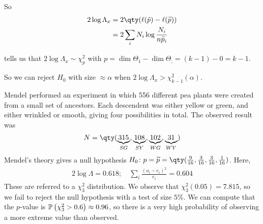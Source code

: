 So 
\begin{align*}
	2 \log \Lambda_x &= 2\qty(\ell(\hat p) - \ell(\widetilde p)) \\
	&= 2 \sum_i N_i \log \frac{N_i}{n \widetilde{p}_i}
\end{align*}

 tells us that $2 \log \Lambda_x \sim \chi_p^2$ with $p = \dim \Theta_1 - \dim \Theta_; = (k - 1) - 0 = k - 1$.

So we can reject $H_0$ with size $\approx \alpha$ when $2 \log \Lambda_x > \chi_{k - 1}^2(\alpha)$.

\begin{example}
	Mendel performed an experiment in which 556 different pea plants were created from a small set of ancestors.
	Each descendent was either yellow or green, and either wrinkled or smooth, giving four possibilities in total.
	The observed result was
	\begin{align*}
		N = \qty(\underbrace{315}_{SG}, \underbrace{108}_{SY}, \underbrace{102}_{WG}, \underbrace{31}_{WY})
	\end{align*}
	Mendel's theory gives a null hypothesis $H_0 \colon p = \widetilde p = \qty(\frac{9}{16}, \frac{3}{16}, \frac{3}{16}, \frac{1}{16})$.
	Here,
	\begin{align*}
		2 \log \Lambda = 0.618;\quad \sum_i \frac{(o_i - e_i)^2}{e_i} = 0.604
	\end{align*}
	These are referred to a $\chi^2_3$ distribution.
	We observe that $\chi^2_3(0.05) = 7.815$, so we fail to reject the null hypothesis with a test of size $5\%$.
	We can compute that the $p$-value is $\mathbb{P}\left({\chi^2_3 > 0.6}\right) \approx 0.96$, so there is a very high probability of observing a more extreme value than observed.
\end{example}

